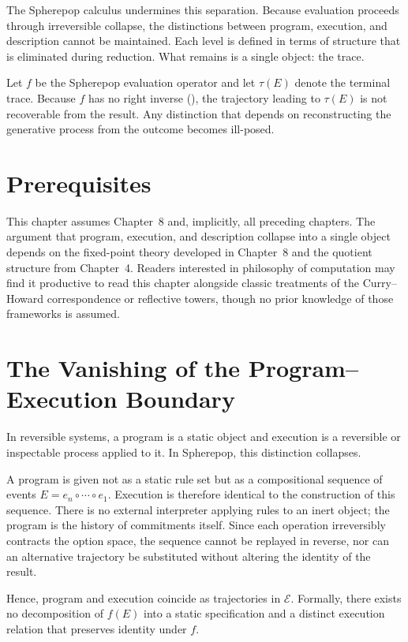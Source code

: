 \documentclass[12pt, oneside]{amsbook}
\theoremstyle{plain}
\theoremstyle{definition}
\theoremstyle{remark}
\newcommand{\Expr}{\mathcal{E}}
\newcommand{\evalf}{f}
\newcommand{\trace}{\tau}
\begin{document}
The Spherepop calculus undermines this separation. Because evaluation proceeds
through irreversible collapse, the distinctions between program, execution, and
description cannot be maintained. Each level is defined in terms of structure
that is eliminated during reduction. What remains is a single object: the trace.

Let $\evalf$ be the Spherepop evaluation operator and let $\trace(E)$ denote
the terminal trace. Because $\evalf$ has no right inverse
(), the trajectory leading to $\trace(E)$ is not
recoverable from the result. Any distinction that depends on reconstructing the
generative process from the outcome becomes ill-posed.

\section{Prerequisites}

This chapter assumes Chapter~8 and, implicitly, all preceding chapters. The argument that program, execution, and description collapse into a single object depends on the fixed-point theory developed in Chapter~8 and the quotient structure from Chapter~4. Readers interested in philosophy of computation may find it productive to read this chapter alongside classic treatments of the Curry--Howard correspondence or reflective towers, though no prior knowledge of those frameworks is assumed.

\section{The Vanishing of the Program--Execution Boundary}
\label{sec:pec:boundary}

In reversible systems, a program is a static object and execution is a
reversible or inspectable process applied to it. In Spherepop, this distinction
collapses.

A program is given not as a static rule set but as a compositional sequence of
events $E = e_n \circ \cdots \circ e_1$. Execution is therefore identical to
the construction of this sequence. There is no external interpreter applying
rules to an inert object; the program is the history of commitments itself.
Since each operation irreversibly contracts the option space, the sequence
cannot be replayed in reverse, nor can an alternative trajectory be substituted
without altering the identity of the result.

Hence, program and execution coincide as trajectories in $\Expr$. Formally,
there exists no decomposition of $\evalf(E)$ into a static specification and a
distinct execution relation that preserves identity under $\evalf$.
\end{document}
